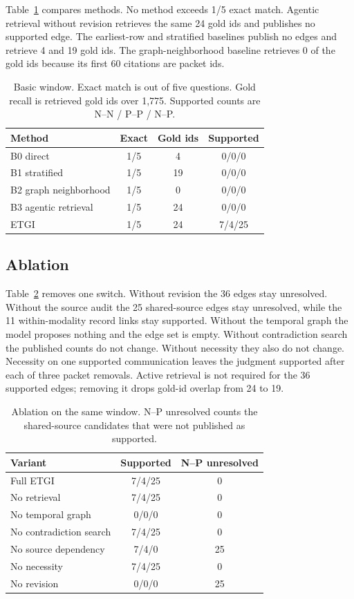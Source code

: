 \documentclass[conference]{IEEEtran}
\begin{document}
Table~\ref{tab:methods} compares methods.
No method exceeds 1/5 exact match.
Agentic retrieval without revision retrieves the same 24 gold ids and publishes no supported edge.
The earliest-row and stratified baselines publish no edges and retrieve 4 and 19 gold ids.
The graph-neighborhood baseline retrieves 0 of the gold ids because its first 60 citations are packet ids.

\begin{table}[t]
\caption{Basic window. Exact match is out of five questions. Gold recall is retrieved gold ids over 1,775. Supported counts are N--N / P--P / N--P.}
\label{tab:methods}
\centering
\begin{tabular}{lccc}
\toprule
Method & Exact & Gold ids & Supported \\
\midrule
B0 direct & 1/5 & 4 & 0/0/0 \\
B1 stratified & 1/5 & 19 & 0/0/0 \\
B2 graph neighborhood & 1/5 & 0 & 0/0/0 \\
B3 agentic retrieval & 1/5 & 24 & 0/0/0 \\
ETGI & 1/5 & 24 & 7/4/25 \\
\bottomrule
\end{tabular}
\end{table}

\subsection{Ablation}
Table~\ref{tab:ablation} removes one switch.
Without revision the 36 edges stay unresolved.
Without the source audit the 25 shared-source edges stay unresolved, while the 11 within-modality record links stay supported.
Without the temporal graph the model proposes nothing and the edge set is empty.
Without contradiction search the published counts do not change.
Without necessity they also do not change.
Necessity on one supported communication leaves the judgment supported after each of three packet removals.
Active retrieval is not required for the 36 supported edges; removing it drops gold-id overlap from 24 to 19.

\begin{table}[t]
\caption{Ablation on the same window. N--P unresolved counts the shared-source candidates that were not published as supported.}
\label{tab:ablation}
\centering
\begin{tabular}{lcc}
\toprule
Variant & Supported & N--P unresolved \\
\midrule
Full ETGI & 7/4/25 & 0 \\
No retrieval & 7/4/25 & 0 \\
No temporal graph & 0/0/0 & 0 \\
No contradiction search & 7/4/25 & 0 \\
No source dependency & 7/4/0 & 25 \\
No necessity & 7/4/25 & 0 \\
No revision & 0/0/0 & 25 \\
\bottomrule
\end{tabular}
\end{table}
\end{document}
